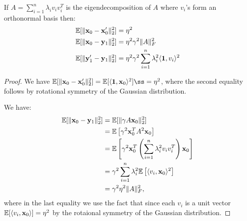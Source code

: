 \begin{lemma}\label{lem:first-pgd-step-geometry}
	If $A = \sum_{i = 1}^n \lambda_i v_i v_i^T$ is the eigendecomposition of $A$ where $v_i$'s form an orthonormal basis then:
	\begin{align*}
	&\mathbb E[\|\mathbf x_0 - \mathbf x_0'\|_2^2] = \eta^2 \\
	&\mathbb E[\|\mathbf x_0 - \mathbf y_1\|_2^2 ] = \eta^2 \gamma^2 \|A\|_F^2\\
	&\mathbb E[\|\mathbf y_1' - \mathbf y_1\|_2^2] = \eta^2 \gamma^2 \sum_{i = 1}^n \lambda_i^2 \langle \mathbf{1}, v_i \rangle^2
	\end{align*}
\end{lemma}
\begin{proof}
	We have $\mathbb E[\|\vx_0 - \vx_0'\|_2^2] = \mathbb E[\langle \vone, \vx_0 \rangle^2]ß = \eta^2$, where the second equality follows by rotational symmetry of the Gaussian distribution. 
	
	
	We have: 
	\begin{align*}
	\mathbb E[\|\mathbf x_0 - \mathbf y_1\|_2^2] &= \mathbb E[\|\gamma A \mathbf x_0\|_2^2] \\
	&= \mathbb E\left[\gamma^2 \mathbf x_0^T A^2 \mathbf x_0 \right]\\
	&= \mathbb E\left[\gamma^2 \mathbf x_0^T \left(\sum_{i = 1}^n \lambda^2_i v_i v_i^T\right) \mathbf x_0 \right]\\
	&= \gamma^2 \sum_{i = 1}^n \lambda^2_i \mathbb E\left[\langle v_i, \mathbf x_0\rangle^2\right] \\
	&= \gamma^2 \eta^2 \|A\|_F^2,
	\end{align*}
	where in the last equality we use the fact that since each $v_i$ is a unit vector $\mathbb E[\langle v_i, \mathbf x_0\rangle ] = \eta^2$ by the rotaional symmetry of the Gaussian distribution.
	

\end{proof}

